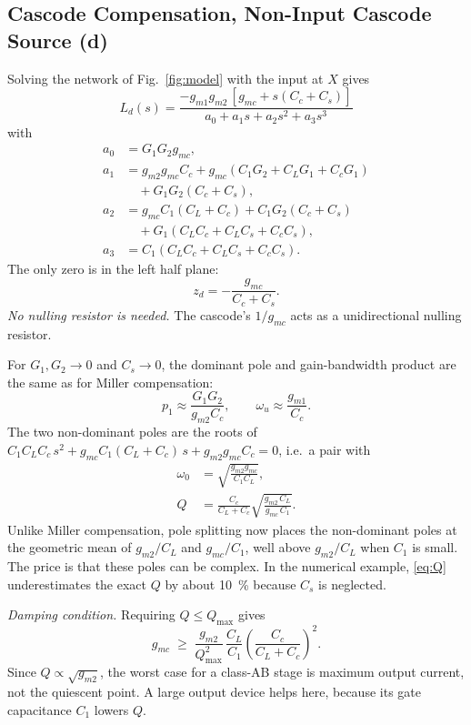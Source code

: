 \documentclass[journal]{IEEEtran}
\newcommand{\gmo}{g_{m1}}
\newcommand{\gmt}{g_{m2}}
\newcommand{\gmc}{g_{mc}}
\begin{document}
\subsection{Cascode Compensation, Non-Input Cascode Source (d)}
Solving the network of Fig.~\ref{fig:model} with the input at $X$ gives
\begin{equation}
L_d(s) = \frac{-\gmo\gmt\,[\gmc + s(C_c+C_s)]}{a_0 + a_1s + a_2s^2 + a_3s^3}
\label{eq:Ld}
\end{equation}
with
\begin{align*}
a_0 &= G_1G_2\gmc,\\
a_1 &= \gmt\gmc C_c + \gmc(C_1G_2 + C_LG_1 + C_cG_1)\\
    &\quad + G_1G_2(C_c+C_s),\\
a_2 &= \gmc C_1(C_L+C_c) + C_1G_2(C_c+C_s)\\
    &\quad + G_1(C_LC_c + C_LC_s + C_cC_s),\\
a_3 &= C_1(C_LC_c + C_LC_s + C_cC_s).
\end{align*}
The only zero is in the left half plane:
\begin{equation}
z_d = -\frac{\gmc}{C_c + C_s}.
\label{eq:zd}
\end{equation}
\emph{No nulling resistor is needed.} The cascode's $1/\gmc$ acts as a unidirectional nulling resistor.

For $G_1, G_2 \to 0$ and $C_s \to 0$, the dominant pole and gain-bandwidth product are the same as for Miller compensation:
\begin{equation}
p_1 \approx \frac{G_1G_2}{\gmt C_c}, \qquad \omega_u \approx \frac{\gmo}{C_c}.
\end{equation}
The two non-dominant poles are the roots of
$C_1C_LC_c\,s^2 + \gmc C_1(C_L+C_c)\,s + \gmt\gmc C_c = 0$, i.e.\ a pair with
\begin{align}
\omega_0 &= \sqrt{\frac{\gmt\gmc}{C_1C_L}}, \label{eq:w0}\\
Q &= \frac{C_c}{C_L+C_c}\sqrt{\frac{\gmt\,C_L}{\gmc\,C_1}}. \label{eq:Q}
\end{align}
Unlike Miller compensation, pole splitting now places the non-dominant poles at the geometric mean of $\gmt/C_L$ and $\gmc/C_1$, well above $\gmt/C_L$ when $C_1$ is small. The price is that these poles can be complex. In the numerical example, \eqref{eq:Q} underestimates the exact $Q$ by about \SI{10}{\%} because $C_s$ is neglected.

\emph{Damping condition.} Requiring $Q \le Q_{\max}$ gives
\begin{equation}
\gmc \;\ge\; \frac{\gmt}{Q_{\max}^2}\,\frac{C_L}{C_1}\left(\frac{C_c}{C_L+C_c}\right)^{2}.
\label{eq:damp}
\end{equation}
Since $Q\propto\sqrt{\gmt}$, the worst case for a class-AB stage is maximum output current, not the quiescent point. A large output device helps here, because its gate capacitance $C_1$ lowers $Q$.
\end{document}
